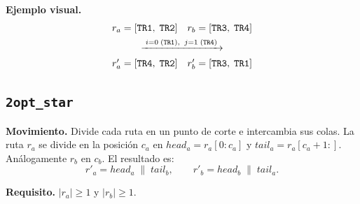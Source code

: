 \documentclass[12pt, a4paper]{article}
\begin{document}
\noindent\textbf{Ejemplo visual.}
\[
    \begin{array}{ll}
    r_a = [\mathtt{TR1},\; \mathtt{TR2}] & r_b = [\mathtt{TR3},\; \mathtt{TR4}]\\[4pt]
    \multicolumn{2}{c}{\xrightarrow{\;i=0\;(\mathtt{TR1}),\;\; j=1\;(\mathtt{TR4})\;}}\\[4pt]
    r'_a = [\mathtt{TR4},\; \mathtt{TR2}] & r'_b = [\mathtt{TR3},\; \mathtt{TR1}]
    \end{array}
\]

\subsection{\texttt{2opt\_star}}

\textbf{Movimiento.} Divide cada ruta en un punto de corte e intercambia
sus colas.  La ruta $r_a$ se divide en la posición $c_a$ en
$\mathit{head}_a = r_a[0{:}c_a]$ y $\mathit{tail}_a = r_a[c_a{+}1{:}]$.
Análogamente $r_b$ en $c_b$.  El resultado es:
\[
    r'_a = \mathit{head}_a \;\|\; \mathit{tail}_b,
    \qquad
    r'_b = \mathit{head}_b \;\|\; \mathit{tail}_a.
\]

\textbf{Requisito.} $|r_a| \geq 1$ y $|r_b| \geq 1$.
\end{document}
